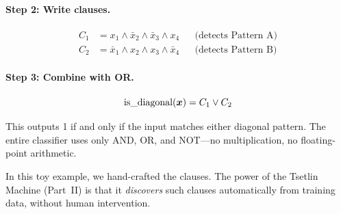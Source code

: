 \paragraph{Step 2: Write clauses.}
\begin{align*}
  C_1 &= x_1 \wedge \bar{x}_2 \wedge \bar{x}_3 \wedge x_4
    && \text{(detects Pattern A)} \\
  C_2 &= \bar{x}_1 \wedge x_2 \wedge x_3 \wedge \bar{x}_4
    && \text{(detects Pattern B)}
\end{align*}

\paragraph{Step 3: Combine with OR.}
\[
  \text{is\_diagonal}(\bm{x}) = C_1 \vee C_2
\]

This outputs 1 if and only if the input matches either diagonal
pattern. The entire classifier uses only AND, OR, and NOT---no
multiplication, no floating-point arithmetic.

\begin{engineernote}
In this toy example, we hand-crafted the clauses. The power of the
Tsetlin Machine (Part~II) is that it \emph{discovers} such clauses
automatically from training data, without human intervention.
\end{engineernote}
